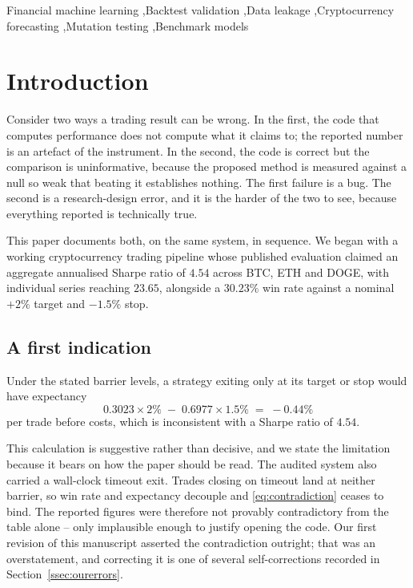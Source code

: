 \documentclass[preprint,12pt,authoryear]{elsarticle}
\begin{document}
\begin{frontmatter}
\begin{keyword}
Financial machine learning \sep Backtest validation \sep Data leakage
\sep Cryptocurrency forecasting \sep Mutation testing \sep Benchmark models
\end{keyword}

\end{frontmatter}

\section{Introduction}
\label{sec:intro}

Consider two ways a trading result can be wrong. In the first, the code that
computes performance does not compute what it claims to; the reported number is
an artefact of the instrument. In the second, the code is correct but the
comparison is uninformative, because the proposed method is measured against a
null so weak that beating it establishes nothing. The first failure is a bug.
The second is a research-design error, and it is the harder of the two to see,
because everything reported is technically true.

This paper documents both, on the same system, in sequence. We began with a
working cryptocurrency trading pipeline whose published evaluation claimed an
aggregate annualised Sharpe ratio of $4.54$ across BTC, ETH and DOGE, with
individual series reaching $23.65$, alongside a $30.23\%$ win rate against a
nominal $+2\%$ target and $-1.5\%$ stop.

\subsection{A first indication}

Under the stated barrier levels, a strategy exiting only at its target or stop
would have expectancy
\begin{equation}
0.3023 \times 2\% \;-\; 0.6977 \times 1.5\% \;=\; -0.44\%
\label{eq:contradiction}
\end{equation}
per trade before costs, which is inconsistent with a Sharpe ratio of $4.54$.

This calculation is suggestive rather than decisive, and we state the limitation
because it bears on how the paper should be read. The audited system also
carried a wall-clock timeout exit. Trades closing on timeout land at neither
barrier, so win rate and expectancy decouple and \eqref{eq:contradiction} ceases
to bind. The reported figures were therefore not provably contradictory from the
table alone -- only implausible enough to justify opening the code. Our first
revision of this manuscript asserted the contradiction outright; that was an
overstatement, and correcting it is one of several self-corrections recorded in
Section~\ref{ssec:ourerrors}.
\end{document}

